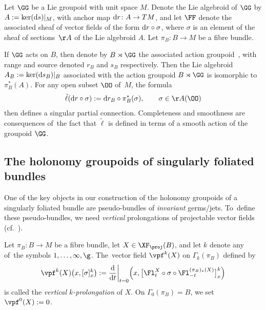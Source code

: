 \begin{Example}\label{equiex}
Let $\GG$ be a Lie groupoid with unit space $M$. Denote the Lie algebroid of $\GG$ by $A:=\ker({\rm d}s)|_{M}$, with anchor map ${\rm d}r\colon A\rightarrow TM$, and let $\FF$ denote the associated sheaf of vector fields of the form ${\rm d}r\circ\sigma$, where $\sigma$ is an element of the sheaf of sections~$\AA$ of the Lie algebroid $A$. Let $\pi_{B}\colon B\rightarrow M$ be a fibre bundle.

If $\GG$ acts on $B$, then denote by $B\rtimes\GG$ the associated action groupoid~\cite[Example 2.2]{aac1}, with range and source denoted $r_{B}$ and $s_{B}$ respectively. Then the Lie algebroid $A_{B}:=\ker({\rm d}s_{B})|_{B}$ associated with the action groupoid $B\rtimes\GG$ is isomorphic to $\pi_{B}^{*}(A)$. For any open subset $\OO$ of~$M$, the formula
\begin{gather*}
\tilde{\ell}({\rm d}r\circ\sigma):={\rm d}r_{B}\circ\pi_{B}^{*}(\sigma),\qquad \sigma\in\AA(\OO)
\end{gather*}
then defines a singular partial connection. Completeness and smoothness are consequences of~the fact that $\tilde{\ell}$ is defined in terms of a smooth action of the groupoid $\GG$.
\end{Example}


\subsection{The holonomy groupoids of singularly foliated bundles}

One of the key objects in our construction of the holonomy groupoids of a singularly foliated bundle are pseudo-bundles of \textit{invariant} germs/jets. To~define these pseudo-bundles, we need \textit{vertical} prolongations of projectable vector fields (cf.~\cite[Definition~1.15]{varbi}).

\begin{Definition}
Let $\pi_{B}\colon B\rightarrow M$ be a fibre bundle, let $X\in\XF_{\proj}(B)$, and let $k$ denote any of~the symbols $1,\dots,\infty,\g$. The~vector field $\vpf^{k}(X)$ on $\Gamma_{k}(\pi_{B})$ defined by
\begin{gather*}
\vpf^{k}(X)\big(x,[\sigma]^{k}_{x}\big):=\frac{\rm d}{{\rm d}t}\bigg|_{t=0}\Big(x,\big[\Fl^{X}_{t}\circ\sigma\circ\Fl^{(\pi_{B})_{*}(X)}_{-t}\big]_{x}^{k}\Big)
\end{gather*}
is called the \textit{vertical $k$-prolongation} of $X$. On $\Gamma_{0}(\pi_{B}) = B$, we set $\vpf^{0}(X):=0$.
\end{Definition}

